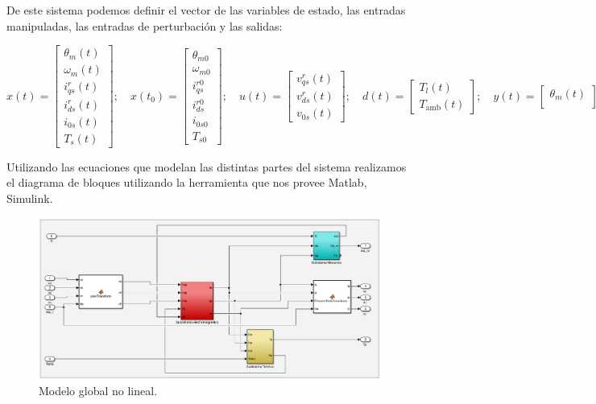 \documentclass{article}
\begin{document}
De este sistema podemos definir el vector de las variables de estado, las entradas 
manipuladas, las entradas de perturbación y las salidas:

\[ x(t) =
\begin{bmatrix}
\theta_m(t) \\
\omega_m(t) \\
i^r_{qs}(t) \\
i^r_{ds}(t) \\
i_{0s}(t) \\
T_s(t)
\end{bmatrix}
; \quad
x(t_0) =
\begin{bmatrix}
\theta_{m0} \\
\omega_{m0} \\
i^{r0}_{qs} \\
i^{r0}_{ds} \\
i_{0s0} \\
T_{s0}
\end{bmatrix}
; \quad
u(t) =
\begin{bmatrix}
v^r_{qs}(t) \\
v^r_{ds}(t) \\
v_{0s}(t)
\end{bmatrix}
; \quad
d(t) =
\begin{bmatrix}
T_l(t) \\
T_{\text{amb}}(t)
\end{bmatrix}
; \quad
y(t) = 
\begin{bmatrix}
    \theta_m(t) \\
\end{bmatrix}
\]


Utilizando las ecuaciones que modelan las distintas partes del sistema realizamos el 
diagrama de bloques utilizando la herramienta que nos provee Matlab, Simulink.

\begin{figure}[H]
    \centering
    \includegraphics[width=1\textwidth]{no_lineal.png}
    \caption{Modelo global no lineal.}
\end{figure}
\end{document}
